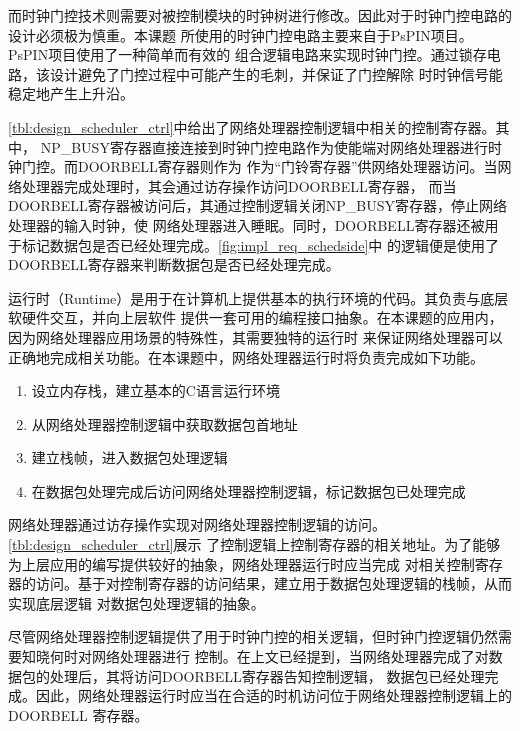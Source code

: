 
而时钟门控技术则需要对被控制模块的时钟树进行修改。因此对于时钟门控电路的设计必须极为慎重。本课题
所使用的时钟门控电路主要来自于PsPIN项目\cite{di2020pspin}。PsPIN项目使用了一种简单而有效的
组合逻辑电路来实现时钟门控。通过锁存电路，该设计避免了门控过程中可能产生的毛刺，并保证了门控解除
时时钟信号能稳定地产生上升沿。


\autoref{tbl:design_scheduler_ctrl}中给出了网络处理器控制逻辑中相关的控制寄存器。其中，
NP\_BUSY寄存器直接连接到时钟门控电路作为使能端对网络处理器进行时钟门控。而DOORBELL寄存器则作为
作为“门铃寄存器”供网络处理器访问。当网络处理器完成处理时，其会通过访存操作访问DOORBELL寄存器，
而当DOORBELL寄存器被访问后，其通过控制逻辑关闭NP\_BUSY寄存器，停止网络处理器的输入时钟，使
网络处理器进入睡眠。同时，DOORBELL寄存器还被用于标记数据包是否已经处理完成。\autoref{fig:impl_req_schedside}中
的逻辑便是使用了DOORBELL寄存器来判断数据包是否已经处理完成。


运行时（Runtime）是用于在计算机上提供基本的执行环境的代码。其负责与底层软硬件交互，并向上层软件
提供一套可用的编程接口抽象。在本课题的应用内，因为网络处理器应用场景的特殊性，其需要独特的运行时
来保证网络处理器可以正确地完成相关功能。在本课题中，网络处理器运行时将负责完成如下功能。

\begin{enumerate}
  \item 设立内存栈，建立基本的C语言运行环境
  \item 从网络处理器控制逻辑中获取数据包首地址
  \item 建立栈帧，进入数据包处理逻辑
  \item 在数据包处理完成后访问网络处理器控制逻辑，标记数据包已处理完成
\end{enumerate}

网络处理器通过访存操作实现对网络处理器控制逻辑的访问。\autoref{tbl:design_scheduler_ctrl}展示
了控制逻辑上控制寄存器的相关地址。为了能够为上层应用的编写提供较好的抽象，网络处理器运行时应当完成
对相关控制寄存器的访问。基于对控制寄存器的访问结果，建立用于数据包处理逻辑的栈帧，从而实现底层逻辑
对数据包处理逻辑的抽象。

尽管网络处理器控制逻辑提供了用于时钟门控的相关逻辑，但时钟门控逻辑仍然需要知晓何时对网络处理器进行
控制。在上文已经提到，当网络处理器完成了对数据包的处理后，其将访问DOORBELL寄存器告知控制逻辑，
数据包已经处理完成。因此，网络处理器运行时应当在合适的时机访问位于网络处理器控制逻辑上的DOORBELL
寄存器。

